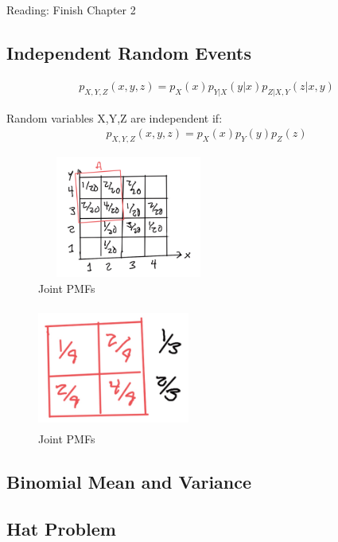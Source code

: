 
 Reading: Finish Chapter 2

\subsection{Independent Random Events}


\begin{align*}
p_{X,Y,Z}(x,y,z)=p_X(x)p_{Y|X}(y|x)p_{Z|X,Y}(z|x,y)
\end{align*}

Random variables X,Y,Z are independent if:
\begin{align*}
p_{X,Y,Z}(x,y,z)=p_X(x)p_{Y}(y)p_{Z}(z)
\end{align*}

\begin{figure}[h]
\centering
\includegraphics[width=6cm, height=4cm]{images/L07/IMG_1544.jpeg}
\caption{Joint PMFs}
\end{figure}

\begin{figure}[h]
\centering
\includegraphics[width=5cm, height=4cm]{images/L07/IMG_1545.jpeg}
\caption{Joint PMFs}
\end{figure}



\subsection{Binomial Mean and Variance}

\subsection{Hat Problem}


